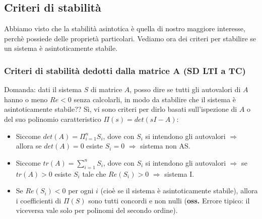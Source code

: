 \subsection{Criteri di stabilità}
Abbiamo visto che la stabilità asintotica è quella di nostro maggiore interesse, perchè possiede delle proprietà particolari. Vediamo ora dei criteri per stabilire se un sistema è asintoticamente stabile.
\subsubsection{Criteri di stabilità dedotti dalla matrice A (SD LTI a TC)}
Domanda: dati il sistema $S$ di matrice $A$, posso dire se tutti gli autovalori di $A$ hanno o meno $Re <0$ senza calcolarli, in modo da stabilire che il sistema è asintoticamente stabile??\newline
\newline
Sì, vi sono criteri per dirlo basati sull'ispezione di $A$ o del suo polinomio caratteristico $\Pi(s) = det (sI-A)$:
\begin{itemize}
    \item Siccome $det(A) = \Pi_{i=1}^{n}S_i$, dove con $S_i$ si intendono gli autovalori $\Longrightarrow$ allora se $det(A) = 0$ esiste $S_i = 0$ $\Longrightarrow$ sistema non AS.
    \item Siccome $tr(A) = \sum_{i=1}^{n}S_i$, dove con $S_i$ si intendono gli autovalori $\Longrightarrow$ se $tr(A) >0$ esiste $S_i$ tale che $Re(S_i) > 0$ $\Longrightarrow$ sistema I.
    \item Se $Re(S_i)<0$ per ogni $i$ (cioè se il sistema è asintoticamente stabile), allora i coefficienti di $\Pi(S)$ sono tutti concordi e non nulli (\textbf{oss.} Errore tipico: il viceversa vale solo per polinomi del secondo ordine).
\end{itemize}